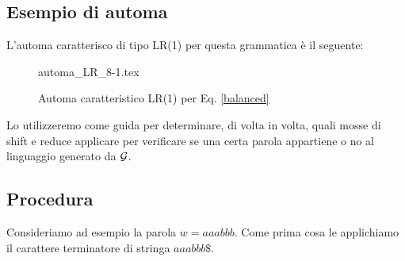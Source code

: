 \documentclass[class=book, crop=false, oneside, 12pt]{standalone}
\begin{document}
\subsection{Esempio di automa}
L'automa caratterisco di tipo LR(1) per questa grammatica è il seguente:
\begin{figure}[H]
    \centering
	{automa_LR_8-1.tex}
    \caption{Automa caratteristico LR(1) per Eq. \ref{balanced}}
    \label{balanced-char_aut-lr1}
\end{figure}
Lo utilizzeremo come guida per determinare, di volta in volta, quali mosse di shift e reduce applicare per verificare se una certa parola appartiene o no al linguaggio generato da \(\mathcal{G}\). 

\subsection{Procedura}
Consideriamo ad esempio la parola \(w = aaabbb\). Come prima cosa le applichiamo il carattere terminatore di stringa \(aaabbb\$\). 
\end{document}
